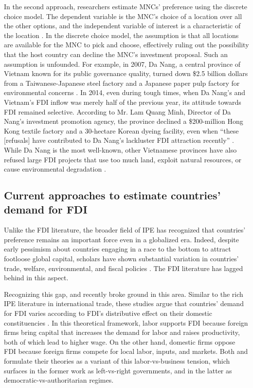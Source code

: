 In the second approach, researchers estimate MNCs' preference using the discrete
choice model. The dependent variable is the MNC's choice of a location over all
the other options, and the independent variable of interest is a characteristic
of the location \citep{Arauzo-Carod2010}. In the discrete choice model, the
assumption is that all locations are available for the MNC to pick and choose,
effectively ruling out the possibility that the host country can decline the
MNC's investment proposal. Such an assumption is unfounded. For example, in
2007, Da Nang, a central province of Vietnam known for its public governance
quality, turned down \$2.5 billion dollars from a Taiwanese-Japanese steel
factory and a Japanese paper pulp factory for environmental concerns
\citep{HDung2007}. In 2014, even during tough times, when Da Nang's and
Vietnam's FDI inflow was merely half of the previous year, its attitude towards
FDI remained selective. According to Mr. Lam Quang Minh, Director of Da Nang's
investment promotion agency, the province declined a \$200-million Hong Kong
textile factory and a 30-hectare Korean dyeing facility, even when ``these
[refusals] have contributed to Da Nang's lackluster FDI attraction recently''
\citep{HaiChau2015}. While Da Nang is the most well-known, other Vietnamese
provinces have also refused large FDI projects that use too much land, exploit
natural resources, or cause environmental degradation \citep{QuocHung2015}.

\subsection{Current approaches to estimate countries' demand for FDI}

Unlike the FDI literature, the broader field of IPE has recognized that
countries' preference remains an important force even in a globalized era.
Indeed, despite early pessimism about countries engaging in a race to the bottom
to attract footloose global capital, scholars have shown substantial variation
in countries' trade, welfare, environmental, and fiscal policies
\citep{Drezner2001}. The FDI literature has lagged behind in this aspect.

Recognizing this gap, \citet{Pinto2013} and \citet{Pandya2016} recently broke
ground in this area. Similar to the rich IPE literature in international trade,
these studies argue that countries' demand for FDI varies according to FDI's
distributive effect on their domestic constituencies \citep{Broz2001,
  Milner2005a}. In this theoretical framework, labor supports FDI because
foreign firms bring capital that increases the demand for labor and raises
productivity, both of which lead to higher wage. On the other hand, domestic
firms oppose FDI because foreign firms compete for local labor, inputs, and
markets. Both \citet{Pinto2013} and \citet{Pandya2016} formulate their theories
as a variant of this labor-vs-business tension, which surfaces in the former
work as left-vs-right governments, and in the latter as
democratic-vs-authoritarian regimes.

